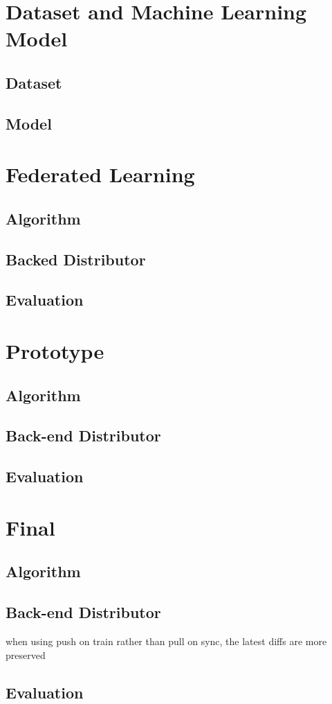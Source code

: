 \section{Dataset and Machine Learning Model}
\subsection{Dataset}
\subsection{Model}

\section{Federated Learning}
\subsection{Algorithm}
\subsection{Backed Distributor}
\subsection{Evaluation}

\section{Prototype}
\subsection{Algorithm}
\subsection{Back-end Distributor}
\subsection{Evaluation}

\section{Final}
\subsection{Algorithm}
\subsection{Back-end Distributor}
when using push on train rather than pull on sync, the latest diffs are more preserved
\subsection{Evaluation}
